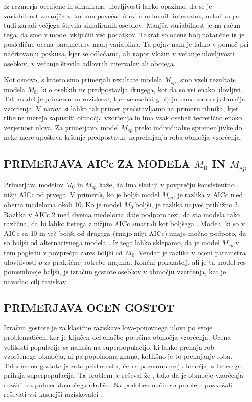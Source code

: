 Iz razmerja ocenjene in simulirane ulovljivosti lahko opazimo, da se je variabilnost zmanjšala, ko smo povečali število odlovnih intervalov, nekoliko pa tudi zaradi večjega števila simuliranih osebkov. Manjša variabilnost je na račun tega, da smo v model vključili več podatkov. Takrat so ocene bolj natančne in je posledično ocena parametrov manj variabilna. Ta pojav nam je lahko v pomoč pri načrtovanju poskusa, kjer se odločamo, ali napor vložiti v večanje ulovljivosti osebkov, v večanje števila odlovnih intervalov ali obojega.

Kot osnovo, s katero smo primerjali rezultate modela $M_{sp}$, smo vzeli rezultate modela $M_0$, ki o osebkih ne predpostavlja drugega, kot da so vsi enako ulovljivi. Tak model je primeren za raziskave, kjer se osebki gibljejo samo znotraj območja vzorčenja. V naravi si lahko tak primer predstavljamo na primeru ribnika, kjer ribe ne morejo zapustiti območja vzorčenja in ima vsak osebek teoretično enako verjetnost ulova. Za primerjavo, model $M_{sp}$ preko individualne spremenljivke do neke mere upošteva kršenje predpostavke neprehajanja roba območja vzorčenja.

\subsection{PRIMERJAVA AICc ZA MODELA $M_0$ IN $M_{sp}$}
Primerjava modelov $M_0$ in $M_{sp}$ kaže, da ima slednji v povprečju konsistentno nižji AICc od prvega. V primerih, ko je boljši model $M_{sp}$, je razlika v AICc med obema modeloma okoli 10. Ko je model $M_0$ boljši, je razlika največ približno 2. Razlika v AICc 2 med dvema modeloma daje podporo tezi, da sta modela tako različna, da bi lahko tistega z nižjim AICc smatrali kot boljšega \citep{boulanger_corrigendum_2001}. Modeli, ki so v AICc za 10 in več boljši od drugega (imajo nižji AICc) imajo močno podporo, da so boljši od alternativnega modela \citep{burnham_model_2002}. Iz tega lahko sklepamo, da je model $M_{sp}$ v tem pogledu v povprečju zares boljši od $M_0$. Vendar je razlika v oceni parametra ulovljivosti $p$ za praktične potrebe majhna. Končni pokazatelj, ali je ta model res pomembneje boljši, je izračun gostote osebkov v območju vzorčenja, kar je navadno cilj raziskav.

\subsection{PRIMERJAVA OCEN GOSTOT}
Izračun gostote je za klasične raziskave lova-ponovnega ulova po svoje problematičen, ker je ključen del enačbe površina območja vzorčenja. Ocena velikosti populacije se nanaša na superpopulacijo, ki lahko prehaja rob vzorčenega območja, ni pa popolnoma znano, kolikšno je to prehajanje roba. Taka ocena gostote je zato pristranska, če ne poznamo mej območja, s katerega prihaja superpopulacija. Ta problem je reševal že \citet{dice_census_1938}, tako da je območje vzorčenja razširil za polmer domačega okoliša. Na podoben način so problem poskušali reševati vsi kasnejši raziskovalci \citep{williams_analysis_2002}.

